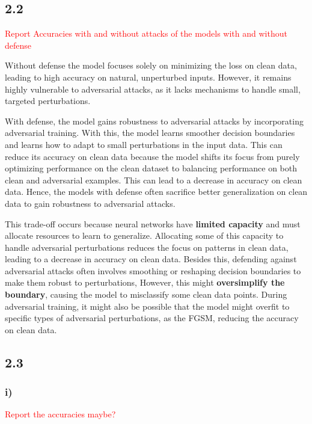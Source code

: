 \documentclass{article}
\begin{document}
\subsection*{2.2}

\textcolor{red}{Report Accuracies with and without attacks of the models with and without defense}

Without defense the model focuses solely on minimizing the loss on clean data, leading to high accuracy on natural,
unperturbed inputs. However, it remains highly vulnerable to adversarial attacks, as it lacks mechanisms to handle small,
targeted perturbations. 

With defense, the model gains robustness to adversarial attacks by incorporating adversarial training. With this,
the model learns smoother decision boundaries and learns how to adapt to small perturbations in the input data. This
can reduce its accuracy on clean data because the model shifts its focus from purely optimizing performance on the clean dataset
to balancing performance on both clean and adversarial examples. This can lead to a decrease in accuracy on clean data.
Hence, the models with defense often sacrifice better generalization on clean data to gain robustness to adversarial attacks.

This trade-off occurs because neural networks have \textbf{limited capacity} and must allocate resources to learn to generalize.
Allocating some of this capacity to handle adversarial perturbations reduces the focus on patterns in clean data, leading to
a decrease in accuracy on clean data.
Besides this, defending against adversarial attacks often involves smoothing or reshaping decision boundaries to make them robust
to perturbations, However, this might \textbf{oversimplify the boundary}, causing the model to misclassify some clean data points.
During adversarial training, it might also be possible that the model might overfit to specific types of adversarial perturbations,
as the FGSM, reducing the accuracy on clean data.


\subsection*{2.3}

\subsubsection*{i)}

\textcolor{red}{Report the accuracies maybe?}
\end{document}
